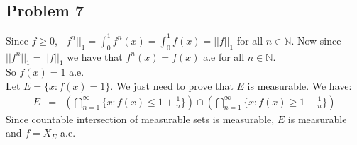 \documentclass[12pt]{article}
\begin{document}
\clearpage
\subsection*{Problem 7}
Since $f \ge 0$, $||f^n||_1=\int_0^1 f^n(x)=\int_0^1 f(x)=||f||_1$ for all $n \in \mathbb{N}$.
Now since $||f^n||_1=||f||_1$ we have that
$f^n(x)=f(x)$ a.e for all $n \in \mathbb{N}$. \\
So $f(x)=1$ a.e. \\
Let $E=\{x:f(x)=1\}$. We just need to prove that $E$ is measurable. We have: \\
\begin{eqnarray*}
E &=& \left(
\bigcap_{n=1}^{\infty} \{x:f(x) \le 1+\frac{1}{n}\} 
\right)
\cap
\left(
\bigcap_{n=1}^{\infty} \{x:f(x) \ge 1-\frac{1}{n}\}
\right)
\end{eqnarray*} 
Since countable intersection of measurable sets is measurable, $E$ is measurable and $f=X_E$ a.e.
\end{document}
